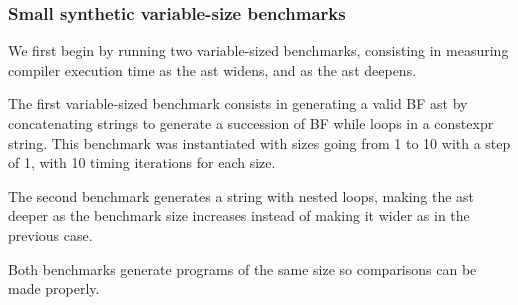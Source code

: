 \documentclass[../main]{subfiles}
\begin{document}
\subsubsection{
  Small synthetic variable-size benchmarks
}
\label{lbl:compile-time-eval}

We first begin by running two variable-sized benchmarks, consisting in
measuring compiler execution time as the \gls{ast} widens, and as the \gls{ast} deepens.

The first variable-sized benchmark consists in generating a valid BF \gls{ast} by
concatenating strings to generate a succession of BF while loops in a
\gls{constexpr} string. This benchmark was instantiated with sizes going from 1 to
10 with a step of 1, with 10 timing iterations for each size.

The second benchmark generates a string with
nested loops, making the \gls{ast} deeper as the benchmark size increases instead
of making it wider as in the previous case.

Both benchmarks generate programs of the same size so comparisons can be made
properly.
\end{document}
